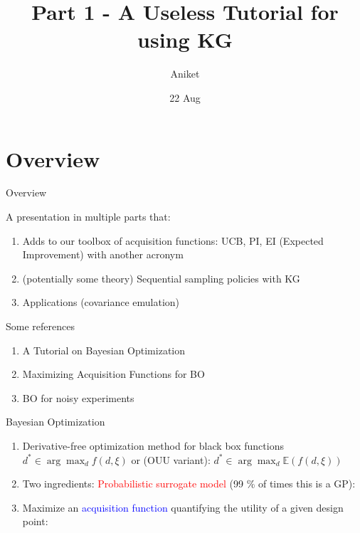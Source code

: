 \documentclass[usenames,dvipsnames]{beamer}
\title[Seminar]{Part 1 - A Useless Tutorial for using KG}
\author[AJ]{Aniket}
\institute[U-M]{University of Michigan}
\date{22 Aug}
\theoremstyle{definition}
\let\oldcite=\cite
\renewcommand{\cite}[2][]{\textcolor{blue}{\oldcite[#1]{#2}}}
\begin{document}
\begin{frame}
\titlepage %
\end{frame}



\section{Overview}
\begin{frame}{Overview}

A presentation in multiple parts that:

\begin{enumerate}
    \item Adds to our toolbox of acquisition functions: UCB, PI, EI (Expected Improvement) with another acronym
    
    \item (potentially some theory) Sequential sampling policies with KG
    
    \item Applications (covariance emulation)
\end{enumerate}

\end{frame}

\begin{frame}{Some references}
    \begin{enumerate}
        \item A Tutorial on Bayesian Optimization \cite{frazier_tutorial_2018}
        
        \item Maximizing Acquisition Functions for BO \cite{wilson_maximizing_2018}
        
        \item BO for noisy experiments \cite{letham_constrained_2019}
    \end{enumerate}
\end{frame}

\begin{frame}{Bayesian Optimization}
    \begin{enumerate}
        \item Derivative-free optimization method for black box functions
        $d^\ast \in \arg \max_d f(d, \xi)$ or (OUU variant): $d^\ast \in \arg \max_d \mathbb{E}(f(d, \xi))$
        
        \item Two ingredients: 
        \textcolor{red}{Probabilistic surrogate model} (99 \% of times this is a GP):

        

        \item Maximize an \textcolor{blue}{acquisition function} quantifying the utility of a given design point:
    \end{enumerate}

\end{frame}
\end{document}
